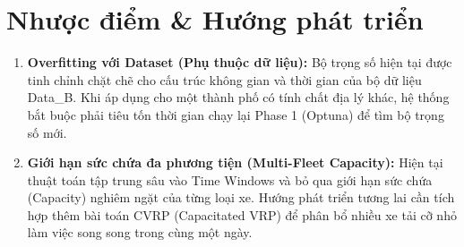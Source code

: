 \section{Nhược điểm \& Hướng phát triển}
\label{sec:nhuoc-diem}
\begin{enumerate}
    \item \textbf{Overfitting với Dataset (Phụ thuộc dữ liệu):} Bộ trọng số hiện tại được tinh chỉnh chặt chẽ cho cấu trúc không gian và thời gian của bộ dữ liệu Data\_B. Khi áp dụng cho một thành phố có tính chất địa lý khác, hệ thống bắt buộc phải tiêu tốn thời gian chạy lại Phase 1 (Optuna) để tìm bộ trọng số mới.
    \item \textbf{Giới hạn sức chứa đa phương tiện (Multi-Fleet Capacity):} Hiện tại thuật toán tập trung sâu vào Time Windows và bỏ qua giới hạn sức chứa (Capacity) nghiêm ngặt của từng loại xe. Hướng phát triển tương lai cần tích hợp thêm bài toán CVRP (Capacitated VRP) để phân bổ nhiều xe tải cỡ nhỏ làm việc song song trong cùng một ngày.
\end{enumerate}

